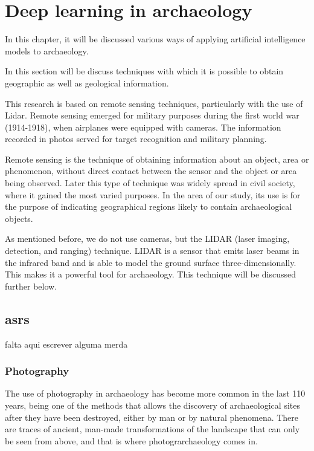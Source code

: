 

\chapter{Deep learning in archaeology}

\begin{introduction}
In this chapter, it will be discussed various ways of applying artificial intelligence models to archaeology.
\end{introduction}
In this section will be discuss techniques with which it is possible to obtain geographic as well as geological information. 

This research is based on remote sensing techniques, particularly with the use of Lidar. Remote sensing emerged for military purposes during the first world war (1914-1918), when airplanes were equipped with cameras. The information recorded in photos served for target recognition and military planning.

Remote sensing is the technique of obtaining information about an object, area or phenomenon, without direct contact between the sensor and the object or area being observed.
Later this type of technique was widely spread in civil society, where it gained the most varied purposes. In the area of our study, its use is for the purpose of indicating geographical regions likely to contain archaeological objects.

As mentioned before, we do not use cameras, but the LIDAR (laser imaging, detection, and ranging) technique. LIDAR is a sensor that emits laser beams in the infrared band and is able to model the ground surface three-dimensionally. This makes it a powerful tool for archaeology. This technique will be discussed further below.


\section{asrs}
falta aqui escrever alguma merda 
\clearpage
\subsection{Photography}
The use of photography in archaeology has become more common in the last 110 years, being one of the methods that allows the discovery of archaeological sites after they have been destroyed, either by man or by natural phenomena. 
There are traces of ancient, man-made transformations of the landscape that can only be seen from above, and that is where photograrchaeology comes in.

